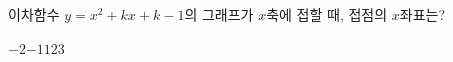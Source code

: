 이차함수 $y=x^2+kx+k-1$의 그래프가 $x$축에 접할 때, 접점의 $x$좌표는? 
\begin{choices32}{$-2$}{$-1$}{$1$}{$2$}{$3$}\end{choices32}
